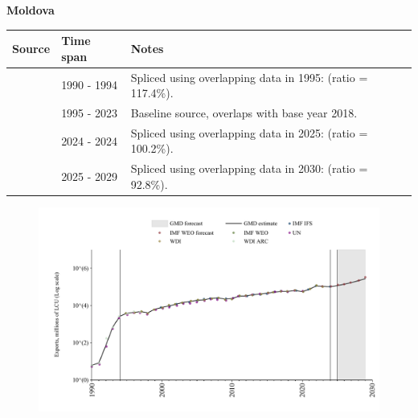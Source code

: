 \documentclass[12pt,a4paper,landscape]{article}
\begin{document}
\begin{adjustbox}{max totalsize={\paperwidth}{\paperheight},center}
\begin{minipage}[t][\textheight][t]{\textwidth}
\vspace*{0.5cm}
{}
\begin{center}
{\Large\bfseries Moldova}
\end{center}
\vspace{0.5cm}
\begin{table}[H]
\centering
\small
\begin{tabular}{|l|l|l|}
\hline
\textbf{Source} & \textbf{Time span} & \textbf{Notes} \\
\hline
\rowcolor{white}\cite{UN}& 1990 - 1994 &Spliced using overlapping data in 1995: (ratio = 117.4\%).\\
\rowcolor{lightgray}\cite{WDI}& 1995 - 2023 &Baseline source, overlaps with base year 2018.\\
\rowcolor{white}\cite{IMF_IFS}& 2024 - 2024 &Spliced using overlapping data in 2025: (ratio = 100.2\%).\\
\rowcolor{lightgray}\cite{IMF_WEO_forecast}& 2025 - 2029 &Spliced using overlapping data in 2030: (ratio = 92.8\%).\\
\hline
\end{tabular}
\end{table}
\begin{figure}[H]
\centering
\includegraphics[width=\textwidth,height=0.6\textheight,keepaspectratio]{graphs/MDA_exports.pdf}
\end{figure}
\end{minipage}
\end{adjustbox}
\end{document}
